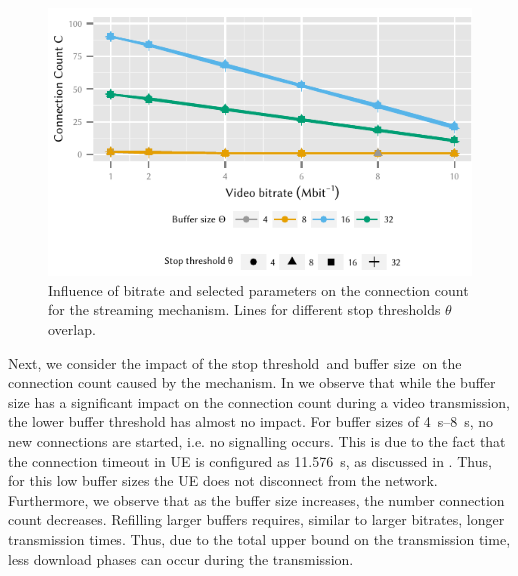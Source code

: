 \begin{figure}
  \centering
  \includegraphics{application/lte_video/numerical_evaluation/figures/bitrate2connections_parameters}
  \caption{Influence of bitrate and selected parameters on the connection count \connectioncount for the streaming mechanism. Lines for different stop thresholds \(\theta\) overlap.}
  \label{fig:application:lte_video:numerical_evaluation:energy_consumption:bitrate2connections_parameters}
\end{figure}

Next, we consider the impact of the stop threshold~\bufferlower and buffer size~\buffersize on the connection count \connectioncount caused by the \streaming mechanism.
In  we observe that while the buffer size has a significant impact on the connection count \connectioncount during a video transmission, the lower buffer threshold has almost no impact.
For buffer sizes of \SIrange{4}{8}{\second}, no new connections are started, i.e. no signalling occurs.
This is due to the fact that the connection timeout in \gls{UE} is configured as \SI{11.576}{\second}, as discussed in .
Thus, for this low buffer sizes the \gls{UE} does not disconnect from the network.
Furthermore, we observe that as the buffer size increases, the number connection count \connectioncount decreases.
Refilling larger buffers requires, similar to larger bitrates, longer transmission times.
Thus, due to the total upper bound on the transmission time, less download phases can occur during the transmission.